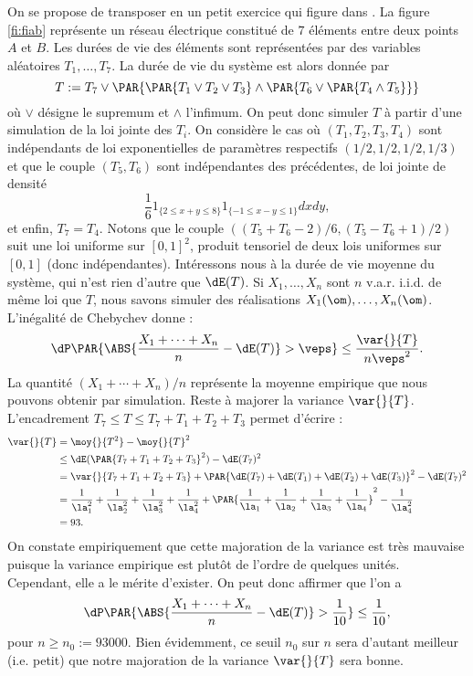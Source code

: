 On se propose de transposer en \ML{} un petit exercice qui figure dans
\cite[page 82]{bouleau}. La figure \ref{fi:fiab} représente un réseau
électrique constitué de $7$ éléments entre deux points $A$ et $B$. Les durées
de vie des éléments sont représentées par des variables aléatoires
$T_1,\ldots,T_7$. La durée de vie du système est alors donnée par
$$
 T := T_7 \lor \PAR{\PAR{T_1 \lor T_2 \lor T_3} \land \PAR{T_6 \lor \PAR{T_4 \land T_5}}}
$$
où $\lor$ désigne le supremum et $\land$ l'infimum. On peut donc simuler $T$
à partir d'une simulation de la loi jointe des $T_i$.
%
%
On considère le cas où $(T_1,T_2,T_3,T_4)$ sont indépendants de loi
exponentielles de paramètres respectifs $(1/2,1/2,1/2,1/3)$ et que le couple
$(T_5,T_6)$ sont indépendantes des précédentes, de loi jointe de densité
$$
\frac{1}{6} 1_{\{2\leq x+y \leq 8\}} 1_{\{-1\leq x-y \leq 1\}} dx dy,
$$
et enfin, $T_7=T_4$.  Notons que le couple $((T_5+T_6-2)/6,(T_5-T_6+1)/2)$
suit une loi uniforme sur $[0,1]^2$, produit tensoriel de deux lois uniformes
sur $[0,1]$ (donc indépendantes).
%
%
Intéressons nous à la durée de vie moyenne du système, qui n'est rien d'autre
que $\dE(T)$.  Si $X_1,\ldots,X_n$ sont $n$ v.a.r. i.i.d. de même loi que $T$,
nous savons simuler des réalisations $X_1(\om),\ldots,X_n(\om)$. L'inégalité
de Chebychev donne :
$$
\dP\PAR{\ABS{\frac{X_1+\cdots+X_n}{n}-\dE(T)}>\veps} \leq\frac{\var{}{T}}{n\veps^2}.
$$
La quantité $(X_1+\cdots+X_n)/n$ représente la moyenne empirique que nous
pouvons obtenir par simulation. Reste à majorer la variance $\var{}{T}$.
L'encadrement $T_7 \leq T \leq T_7+T_1+T_2+T_3$ permet d'écrire :
\begin{align*}
  \var{}{T}&=\moy{}{T^2}-\moy{}{T}^2\\
  &\leq\dE(\PAR{T_7+T_1+T_2+T_3}^2)-\dE(T_7)^2\\
  &=\var{}{T_7+T_1+T_2+T_3}+\PAR{\dE(T_7)+\dE(T_1)+\dE(T_2)+\dE(T_3)}^2-\dE(T_7)^2\\
  &=\frac{1}{\la_1^2}+\frac{1}{\la_2^2}+\frac{1}{\la_3^2}+\frac{1}{\la_4^2}
  +\PAR{\frac{1}{\la_1}+\frac{1}{\la_2}+\frac{1}{\la_3}+\frac{1}{\la_4}}^2
  -\frac{1}{\la_4^2}\\
  &=93.
\end{align*}
On constate empiriquement que cette majoration de la variance est très
mauvaise puisque la variance empirique est plutôt de l'ordre de quelques
unités. Cependant, elle a le mérite d'exister.  On peut donc affirmer que l'on
a
$$
\dP\PAR{\ABS{\frac{X_1+\cdots+X_n}{n}-\dE(T)}>\frac{1}{10}}
\leq\frac{1}{10},
$$
pour $n\geq n_0:=93000$. Bien évidemment, ce seuil $n_0$ sur $n$ sera
d'autant meilleur (i.e. petit) que notre majoration de la variance $\var{}{T}$
sera bonne. 

